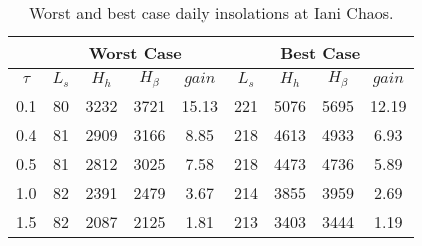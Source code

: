\begin{table}[h]
  \footnotesize
  \centering
  \caption{Worst and best case daily insolations at Iani Chaos.}
  \label{tab:insolation-iani-chaos-clear-and-dusty-days}
  \begin{tabular}{c|c|c|c|c|c|c|c|c|}
    \cline{2-9}
    \multicolumn{1}{l|}{} & \multicolumn{4}{c|}{Worst Case} & \multicolumn{4}{c|}{Best Case} \\ \hline
    \multicolumn{1}{|c|}{$\tau$} & $L_{s}$ & $H_{h}$ & $H_{\beta}$ & $gain$ & $L_{s}$ & $H_{h}$ & $H_{\beta}$ & $gain$ \\ \hline
    \multicolumn{1}{|c|}{0.1} & 80 & 3232 & 3721 & 15.13 & 221 & 5076 & 5695 & 12.19 \\ \hline
    \multicolumn{1}{|c|}{0.4} & 81 & 2909 & 3166 & 8.85 & 218 & 4613 & 4933 & 6.93 \\ \hline
    \multicolumn{1}{|c|}{0.5} & 81 & 2812 & 3025 & 7.58 & 218 & 4473 & 4736 & 5.89 \\ \hline
    \multicolumn{1}{|c|}{1.0} & 82 & 2391 & 2479 & 3.67 & 214 & 3855 & 3959 & 2.69 \\ \hline
    \multicolumn{1}{|c|}{1.5} & 82 & 2087 & 2125 & 1.81 & 213 & 3403 & 3444 & 1.19 \\ \hline
  \end{tabular}
\end{table}

